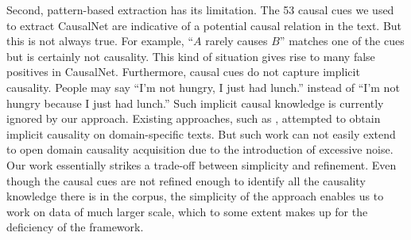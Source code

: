 Second, pattern-based extraction has its limitation.
The 53 causal cues we used to extract CausalNet are indicative of
a potential causal relation in the text. But this is not always true.
For example, ``$A$ rarely causes $B$'' matches one of the cues but is certainly
not causality. This kind of situation gives rise to many false positives in
CausalNet. Furthermore, causal cues do not capture implicit causality.
People may say ``I'm not hungry, I just had lunch.'' instead of
``I'm not hungry because I just had lunch.'' Such implicit causal knowledge
is currently ignored by our approach.
Existing approaches, such as \cite{ittoo2011extracting}, attempted to
obtain implicit causality on domain-specific texts.
But such work can not easily extend to open
domain causality acquisition due to the introduction of excessive noise.
Our work essentially strikes a trade-off between simplicity and
refinement. Even though the causal cues are not refined enough to
identify all the causality knowledge there is in the corpus, the
simplicity of the approach enables us to work on data of much larger
scale, which to some extent makes up for the deficiency of the
framework.
%

%
%
